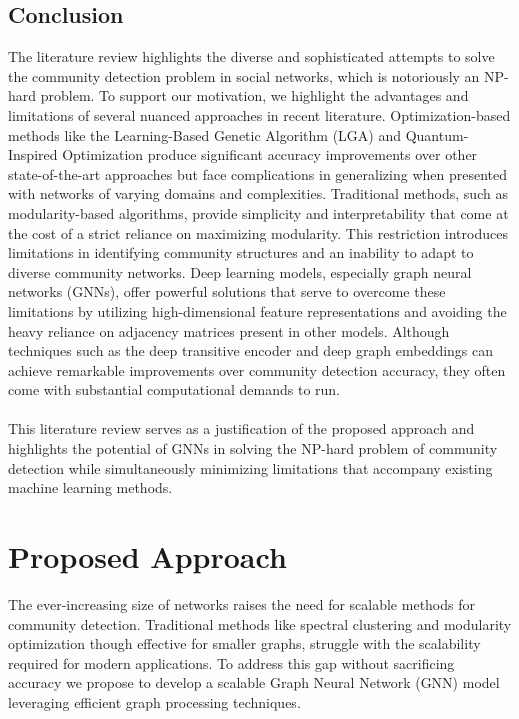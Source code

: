 \documentclass{article}
\begin{document}
\subsection{Conclusion}
The literature review highlights the diverse and sophisticated attempts to solve the community detection problem in social networks, which is notoriously an NP-hard problem. To support our motivation, we highlight the advantages and limitations of several nuanced approaches in recent literature. Optimization-based methods like the Learning-Based Genetic Algorithm (LGA) and Quantum-Inspired Optimization produce significant accuracy improvements over other state-of-the-art approaches but face complications in generalizing when presented with networks of varying domains and complexities. Traditional methods, such as modularity-based algorithms, provide simplicity and interpretability that come at the cost of a strict reliance on maximizing modularity. This restriction introduces limitations in identifying community structures and an inability to adapt to diverse community networks. Deep learning models, especially graph neural networks (GNNs), offer powerful solutions that serve to overcome these limitations by utilizing high-dimensional feature representations and avoiding the heavy reliance on adjacency matrices present in other models. Although techniques such as the deep transitive encoder and deep graph embeddings can achieve remarkable improvements over community detection accuracy, they often come with substantial computational demands to run.\\\\This literature review serves as a justification of the proposed approach and highlights the potential of GNNs in solving the NP-hard problem of community detection while simultaneously minimizing limitations that accompany existing machine learning methods.

\section{Proposed Approach}
The ever-increasing size of networks raises the need for scalable methods for community detection. Traditional methods like spectral clustering and modularity optimization though effective for smaller graphs, struggle with the scalability required for modern applications. To address this gap without sacrificing accuracy we propose to develop a scalable Graph Neural Network (GNN) model leveraging efficient graph processing techniques.
\end{document}
